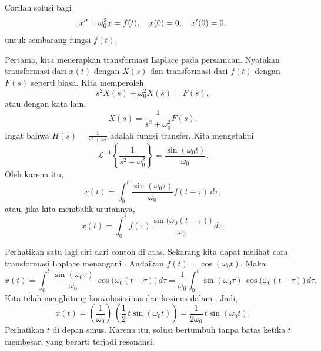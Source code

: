 \begin{example} \label{example:undampedforcedbylaplacearbitrhs}
Carilah solusi bagi
\begin{equation*}
x'' + \omega_0^2 x = f(t) , \quad x(0) = 0, \quad x'(0) = 0 ,
\avoidbreak
\end{equation*}
untuk sembarang fungsi $f(t)$.

Pertama, kita menerapkan transformasi Laplace pada persamaan.  Nyatakan
transformasi dari $x(t)$ dengan $X(s)$ dan transformasi dari $f(t)$ dengan
$F(s)$ seperti biasa.  Kita memperoleh
\begin{equation*}
s^2 X(s) + \omega_0^2 X(s) = F(s) ,
\end{equation*}
atau dengan kata lain,
\begin{equation*}
X(s) = \frac{1}{s^2+ \omega_0^2} F(s).
\end{equation*}
Ingat bahwa $H(s) = \frac{1}{s^2+ \omega_0^2}$ adalah fungsi transfer.
Kita mengetahui
\begin{equation*}
{\mathcal{L}}^{-1} \left\{
\frac{1}{s^2+ \omega_0^2}
\right\} = 
\frac{\sin (\omega_0 t)}{\omega_0} .
\end{equation*}
Oleh karena itu,
\begin{equation*}
x(t) = 
\int_0^t
\frac{\sin (\omega_0 \tau)}{\omega_0}
f(t-\tau) \, d\tau ,
\end{equation*}
atau, jika kita membalik urutannya,
\begin{equation*}
x(t) = 
\int_0^t
f(\tau) 
\frac{\sin \bigl( \omega_0 (t-\tau) \bigr)}{\omega_0} \, d\tau .
\end{equation*}
\end{example}

Perhatikan satu lagi ciri dari contoh di atas.
Sekarang kita dapat melihat cara transformasi Laplace
menangani .  Andaikan $f(t) =
\cos (\omega_0 t)$.  Maka
\begin{equation*}
x(t) = 
\int_0^t
\frac{\sin (\omega_0 \tau)}{\omega_0} \,
\cos \bigl( \omega_0 (t-\tau) \bigr) \, d\tau
=
\frac{1}{\omega_0}
\int_0^t
\sin ( \omega_0 \tau ) \,
\cos \bigl(\omega_0 (t-\tau) \bigr) \, d\tau .
\end{equation*}
Kita telah menghitung konvolusi sinus dan kosinus dalam
.  Jadi,
\begin{equation*}
x(t) =
\left(
\frac{1}{\omega_0}
\right) \,
\left(
\frac{1}{2} \,
t
\sin ( \omega_0 t )
\right)
=
\frac{1}{2 \omega_0} \,
t
\sin ( \omega_0 t ).
\end{equation*}
Perhatikan $t$ di depan sinus.  Karena itu, solusi bertumbuh tanpa
batas ketika $t$ membesar, yang berarti terjadi resonansi.

